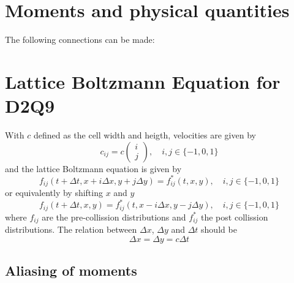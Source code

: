 \documentclass{article}
\begin{document}
\section{Moments and physical quantities}
\label{sec:Moments and physical quantities}

The following connections can be made:
\begin{table}

\end{table}

\section{Lattice Boltzmann Equation for D2Q9}
\label{sec:Lattice Boltzmann Equation for D2Q9}

With $c$ defined as the cell width and heigth, velocities are given by
\begin{equation}
  c_{ij}= c\begin{pmatrix}i \\ j\end{pmatrix}, \quad i,j\in \{-1, 0, 1\}
\end{equation}
and the lattice Boltzmann equation is given by
\begin{equation}
  f_{ij}(t + \Delta t, x + i \Delta x , y + j \Delta y) = f^*_{ij}(t,x,y), \quad i,j\in \{-1, 0, 1\}
\end{equation}
or equivalently by shifting $x$ and $y$
\begin{equation}
  \label{eq:Lattice Boltzmann Equation}
  f_{ij}(t + \Delta t, x, y) = f^*_{ij}(t,x - i\Delta x , y - j\Delta y), \quad i,j\in \{-1, 0, 1\}
\end{equation}
where $f_{ij}$ are the pre-collission distributions and $f^*_{ij}$ the post collission distributions.
The relation between $\Delta x$, $\Delta y$ and $\Delta t$ should be
\begin{equation}
  \Delta x = \Delta y = c \Delta t
\end{equation}

\subsection{Aliasing of moments}
\label{sub:Aliasing of moments}
\end{document}
